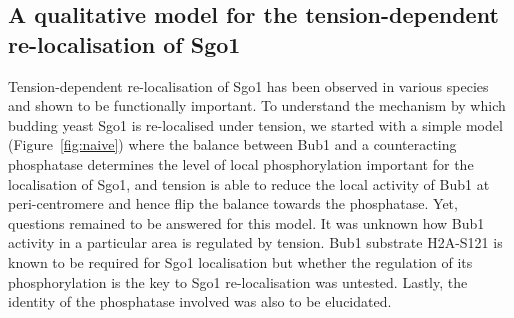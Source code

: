 \subsection{A qualitative model for the tension-dependent re-localisation of Sgo1}

Tension-dependent re-localisation of Sgo1 has been observed in various species and shown to be functionally important. To understand the mechanism by which budding yeast Sgo1 is re-localised under tension, we started with a simple model (Figure~\ref{fig:naive}) where the balance between Bub1 and a counteracting phosphatase determines the level of local phosphorylation important for the localisation of Sgo1, and tension is able to reduce the local activity of Bub1 at peri-centromere and hence flip the balance towards the phosphatase. Yet, questions remained to be answered for this model. It was unknown how Bub1 activity in a particular area is regulated by tension. Bub1 substrate H2A-S121 is known to be required for Sgo1 localisation but whether the regulation of its phosphorylation is the key to Sgo1 re-localisation was untested. Lastly, the identity of the phosphatase involved was also to be elucidated. 

